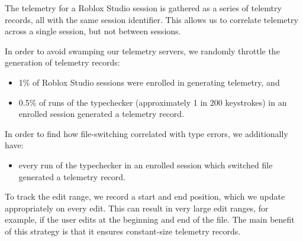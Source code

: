 \documentclass[english,submission,cleveref]{programming}
\begin{document}
The telemetry for a Roblox Studio session is gathered as a series of
telemtry records, all with the same \panon{} session
identifier. This allows us to correlate telemetry across a single
session, but not between sessions.

In order to avoid swamping our telemetry servers, we randomly throttle
the generation of telemetry records:
\begin{itemize}
  \item
    1\% of Roblox Studio sessions were enrolled in generating telemetry, and
  \item
    0.5\% of runs of the typechecker (approximately 1 in 200 keystrokes)
      in an enrolled session generated a telemetry record.
\end{itemize}
In order to find how file-switching correlated with type errors, we additionally have:
\begin{itemize}
  \item
    every run of the typechecker in an enrolled session which switched file generated a telemetry record.
\end{itemize}

To track the edit range, we record a start and end position, which we
update appropriately on every edit. This can result in very large edit
ranges, for example, if the user edits at the beginning and end of the
file.
The main benefit of this strategy is that it ensures constant-size telemetry records.
\end{document}
